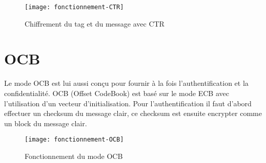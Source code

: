 \begin{figure}[!h]
  \centering
  \texttt{[image: fonctionnement-CTR]}
  \caption{Chiffrement du tag et du message avec CTR}
  \label{Chiffrement du tag et du message avec CTR}
\end{figure}




\section{OCB}
Le mode OCB est lui aussi conçu pour fournir à la fois l'authentification et la confidentialité. OCB (Offset CodeBook) est basé sur le mode ECB avec l'utilisation d'un vecteur d'initialisation. Pour l'authentification il faut d'abord effectuer un checksum du message clair, ce checksum est ensuite encrypter comme un block du message clair. 

\begin{figure}[!h]
  \centering
  \texttt{[image: fonctionnement-OCB]}
  \caption{Fonctionnement du mode OCB}
  \label{Fonctionnement du mode OCB}
\end{figure}
